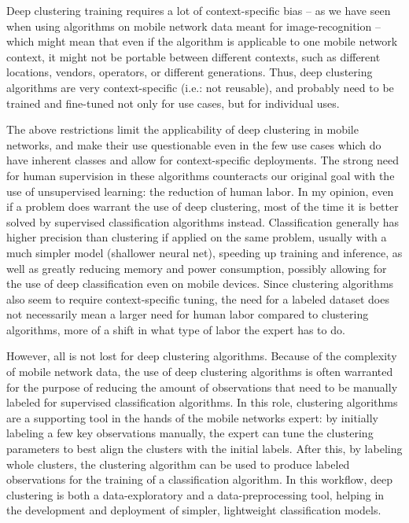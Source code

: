 		Deep clustering training requires a lot of context-specific bias -- as we have seen when using algorithms on mobile network data meant for image-recognition -- which might mean that even if the algorithm is applicable to one mobile network context, it might not be portable between different contexts, such as different locations, vendors, operators, or different generations.
		Thus, deep clustering algorithms are very context-specific (i.e.: not reusable), and probably need to be trained and fine-tuned not only for use cases, but for individual uses.
		
		The above restrictions limit the applicability of deep clustering in mobile networks, and make their use questionable even in the few use cases which do have inherent classes and allow for context-specific deployments.
		The strong need for human supervision in these algorithms counteracts our original goal with the use of unsupervised learning: the reduction of human labor.
		In my opinion, even if a problem does warrant the use of deep clustering, most of the time it is better solved by supervised classification algorithms instead.
		Classification generally has higher precision than clustering if applied on the same problem, usually with a much simpler model (shallower neural net), speeding up training and inference, as well as greatly reducing memory and power consumption, possibly allowing for the use of deep classification even on mobile devices.
		Since clustering algorithms also seem to require context-specific tuning, the need for a labeled dataset does not necessarily mean a larger need for human labor compared to clustering algorithms, more of a shift in what type of labor the expert has to do.		
	
		However, all is not lost for deep clustering algorithms. 
		Because of the complexity of mobile network data, the use of deep clustering algorithms is often warranted for the purpose of reducing the amount of observations that need to be manually labeled for supervised classification algorithms.
		In this role, clustering algorithms are a supporting tool in the hands of the mobile networks expert: by initially labeling a few key observations manually, the expert can tune the clustering parameters to best align the clusters with the initial labels.
		After this, by labeling whole clusters, the clustering algorithm can be used to produce labeled observations for the training of a classification algorithm.
		In this workflow, deep clustering is both a data-exploratory and a data-preprocessing tool, helping in the development and deployment of simpler, lightweight classification models.	